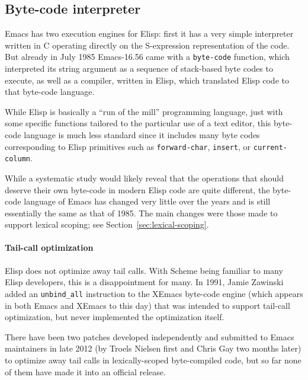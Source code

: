 \documentclass[format=acmsmall, review=false, screen=true]{acmart}
\newcommand \Elisp {Elisp}
\begin{document}
\subsection{Byte-code interpreter}
\label{sec:byte-code-interpreter}

Emacs has two execution engines for \Elisp: first it has a very simple
interpreter written in C operating directly on the S-expression
representation of the code.  But already in July 1985 Emacs-16.56 came with
a \texttt{byte-code} function, which interpreted its string argument as
a sequence of stack-based byte codes to execute, as well as a compiler,
written in \Elisp{}, which translated \Elisp{} code to that
byte-code language.

While \Elisp{} is basically a ``run of the mill'' programming language, just
with some specific functions tailored to the particular use of a text
editor, this byte-code language is much less standard since it includes many
byte codes corresponding to \Elisp{} primitives such as
\texttt{forward-char}, \texttt{insert}, or \texttt{current-column}.

While a systematic study would likely reveal that the operations that should
deserve their own byte-code in modern \Elisp{} code are quite different, the
byte-code language of Emacs has changed very little over the years and is
still essentially the same as that of 1985.  The main changes were
those made to support lexical scoping; see Section~\ref{sec:lexical-scoping}.

\paragraph{Tail-call optimization}

\Elisp{} does not optimize away tail calls.  With Scheme being familiar to
many \Elisp{} developers, this is a disappointment for many.
In 1991, Jamie Zawinski added an \texttt{unbind\_all} instruction to
the XEmacs byte-code engine (which appears in both Emacs and
XEmacs to this day) that was intended to support tail-call optimization,
but never implemented the optimization itself.

There have been two patches developed independently and submitted to Emacs
maintainers in late 2012 (by Troels Nielsen first and Chris Gay two months
later) to optimize away tail calls in lexically-scoped byte-compiled code,
but so far none of them have made it into an official release.
\end{document}

